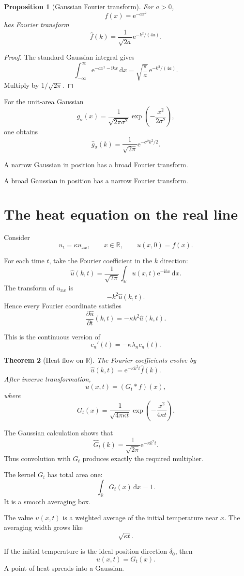 \documentclass[11pt,a5paper,oneside,openany]{scrreprt}
\theoremstyle{notes}
\newtheorem{theorem}{Theorem}[section]
\newtheorem{proposition}[theorem]{Proposition}
\theoremstyle{definitions}
\newcommand{\R}{\mathbb{R}}
\newcommand{\dd}{\,\mathrm{d}}
\newcommand{\e}{\mathrm{e}}
\begin{document}
\begin{proposition}[Gaussian Fourier transform]
For $a>0$,
\[
 f(x)=\e^{-ax^2}
\]
has Fourier transform
\[
 \boxed{
 \widehat f(k)
 =\frac1{\sqrt{2a}}\e^{-k^2/(4a)}.}
\]
\end{proposition}

\begin{proof}
The standard Gaussian integral gives
\[
 \int_{-\infty}^{\infty}
 \e^{-ax^2-\mathrm i kx}\dd x
 =\sqrt{\frac\pi a}\,
 \e^{-k^2/(4a)}.
\]
Multiply by $1/\sqrt{2\pi}$.
\end{proof}

For the unit-area Gaussian
\[
 g_\sigma(x)
 =\frac1{\sqrt{2\pi\sigma^2}}
 \exp\!\left(-\frac{x^2}{2\sigma^2}\right),
\]
one obtains
\[
 \boxed{
 \widehat g_\sigma(k)
 =\frac1{\sqrt{2\pi}}
 \e^{-\sigma^2k^2/2}.}
\]

A narrow Gaussian in position has a broad Fourier transform.

A broad Gaussian in position has a narrow Fourier transform.

\section{The heat equation on the real line}

Consider
\[
 u_t=\kappa u_{xx},
 \qquad
 x\in\R,
 \qquad
 u(x,0)=f(x).
\]

For each time $t$, take the Fourier coefficient in the $k$ direction:
\[
 \widehat u(k,t)
 =\frac1{\sqrt{2\pi}}\int_{\R}
 u(x,t)\e^{-\mathrm i kx}\dd x.
\]
The transform of $u_{xx}$ is
\[
 -k^2\widehat u(k,t).
\]
Hence every Fourier coordinate satisfies
\[
 \frac{\partial\widehat u}{\partial t}(k,t)
 =-\kappa k^2\widehat u(k,t).
\]

This is the continuous version of
\[
 c_n'(t)=-\kappa\lambda_n c_n(t).
\]

\begin{theorem}[Heat flow on $\R$]
The Fourier coefficients evolve by
\[
 \boxed{
 \widehat u(k,t)
 =\e^{-\kappa k^2t}\widehat f(k).}
\]
After inverse transformation,
\[
 \boxed{u(x,t)=(G_t*f)(x),}
\]
where
\[
 \boxed{
 G_t(x)=\frac1{\sqrt{4\pi\kappa t}}
 \exp\!\left(-\frac{x^2}{4\kappa t}\right).}
\]
\end{theorem}

The Gaussian calculation shows that
\[
 \widehat G_t(k)
 =\frac1{\sqrt{2\pi}}\e^{-\kappa k^2t}.
\]
Thus convolution with $G_t$ produces exactly the required multiplier.

\begin{bridge}
The kernel $G_t$ has total area one:
\[
 \int_{\R}G_t(x)\dd x=1.
\]
It is a smooth averaging box.

The value $u(x,t)$ is a weighted average of the initial temperature near
$x$.  The averaging width grows like
\[
 \sqrt{\kappa t}.
\]

If the initial temperature is the ideal position direction $\delta_0$, then
\[
 u(x,t)=G_t(x).
\]
A point of heat spreads into a Gaussian.
\end{bridge}
\end{document}
